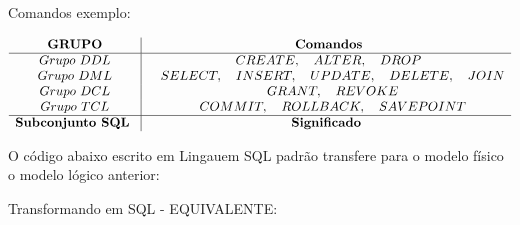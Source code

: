 \documentclass[
]{book}
\begin{document}
Comandos exemplo:

\[
\begin{array}{c| c }
\textbf{GRUPO}    & \textbf{ Comandos}    \\ 
\hline 
Grupo \ DDL         &  \quad  CREATE, \quad ALTER,\quad DROP \ \        \\
Grupo \ DML         &  \quad SELECT, \quad INSERT, \quad UPDATE, \quad DELETE, \quad JOIN    \\
Grupo \ DCL         &  \quad GRANT, \quad REVOKE  \\
Grupo \ TCL         &  \quad COMMIT, \quad ROLLBACK, \quad SAVEPOINT   \\
\hline
\textbf{Subconjunto SQL }    & \textbf{ Significado }     
\end{array}
\]

O código abaixo escrito em Lingauem SQL padrão transfere para o modelo físico o modelo lógico anterior:



Transformando em SQL - EQUIVALENTE:
\end{document}
